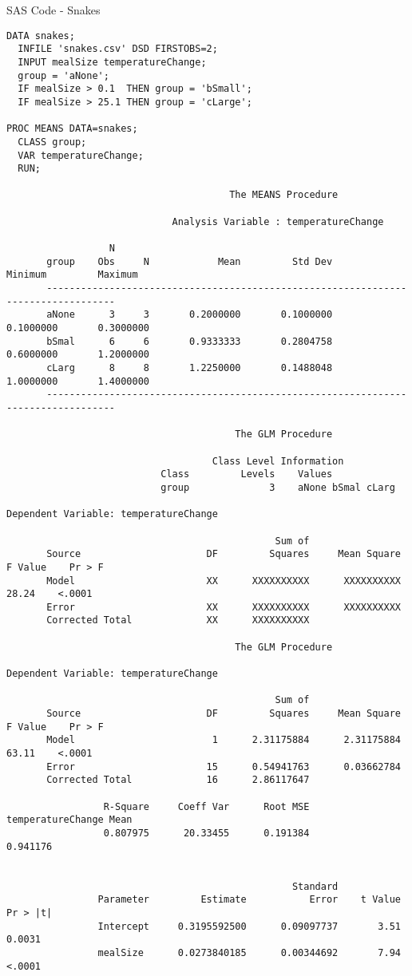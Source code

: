 \documentclass[10pt]{article}
\begin{document}
\newpage
\noindent SAS Code - Snakes

{\small
\begin{verbatim}
DATA snakes;
  INFILE 'snakes.csv' DSD FIRSTOBS=2;
  INPUT mealSize temperatureChange;
  group = 'aNone';
  IF mealSize > 0.1  THEN group = 'bSmall';
  IF mealSize > 25.1 THEN group = 'cLarge';

PROC MEANS DATA=snakes;
  CLASS group;
  VAR temperatureChange;
  RUN;

                                       The MEANS Procedure

                             Analysis Variable : temperatureChange 
 
                  N
       group    Obs     N            Mean         Std Dev         Minimum         Maximum
       ----------------------------------------------------------------------------------
       aNone      3     3       0.2000000       0.1000000       0.1000000       0.3000000
       bSmal      6     6       0.9333333       0.2804758       0.6000000       1.2000000
       cLarg      8     8       1.2250000       0.1488048       1.0000000       1.4000000
       ----------------------------------------------------------------------------------

                                        The GLM Procedure

                                    Class Level Information
                           Class         Levels    Values
                           group              3    aNone bSmal cLarg 
 
Dependent Variable: temperatureChange   

                                               Sum of
       Source                      DF         Squares     Mean Square    F Value    Pr > F
       Model                       XX      XXXXXXXXXX      XXXXXXXXXX      28.24    <.0001
       Error                       XX      XXXXXXXXXX      XXXXXXXXXX                     
       Corrected Total             XX      XXXXXXXXXX  

                                        The GLM Procedure
 
Dependent Variable: temperatureChange   

                                               Sum of
       Source                      DF         Squares     Mean Square    F Value    Pr > F
       Model                        1      2.31175884      2.31175884      63.11    <.0001
       Error                       15      0.54941763      0.03662784                     
       Corrected Total             16      2.86117647                                     

                 R-Square     Coeff Var      Root MSE    temperatureChange Mean
                 0.807975      20.33455      0.191384                  0.941176


                                                  Standard
                Parameter         Estimate           Error    t Value    Pr > |t|
                Intercept     0.3195592500      0.09097737       3.51      0.0031
                mealSize      0.0273840185      0.00344692       7.94      <.0001
\end{verbatim}
}
\end{document}
